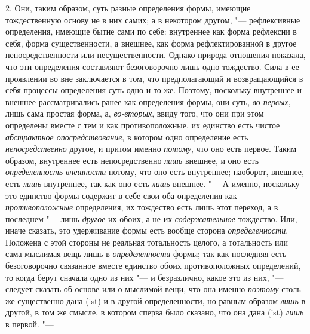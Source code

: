 2. Они, таким образом, суть разные определения формы, имеющие тождественную
основу не в них самих; а в некотором другом, "--- рефлексивные определения,
имеющие бытие сами по себе: внутреннее как форма рефлексии в себя, форма
существенности, а внешнее, как форма рефлектированной в другое
непосредственности или несущественности. Однако природа отношения показала,
что эти определения составляют безоговорочно лишь одно тождество. Сила в ее
проявлении во вне заключается в том, что предполагающий и возвращающийся в
себя процессы определения суть одно и то же. Поэтому, поскольку внутреннее
и внешнее рассматривались ранее как определения формы, они суть,
{\em во-первых}, лишь сама простая форма, а,
{\em во-вторых}, ввиду того, что они при этом
определены вместе с тем и как противоположные, их единство есть чистое
{\em абстрактное опосредствование}, в котором одно
определение есть {\em непосредственно} другое, и притом
именно {\em потому}, что оно есть первое. Таким
образом, внутреннее есть непосредственно {\em лишь}
внешнее, и оно есть {\em определенность внешности}
потому, что оно есть внутреннее; наоборот, внешнее, есть
{\em лишь} внутреннее, так как оно есть
{\em лишь} внешнее. "--- А именно, поскольку это единство
формы содержит в себе свои оба определения как
{\em противоположные} определения, их тождество есть
лишь этот переход, а в последнем "--- лишь {\em другое} их
обоих, а не их {\em содержательное} тождество. Или,
иначе сказать, это удерживание формы есть вообще сторона
{\em определенности}. Положена с этой стороны не
реальная тотальность целого, а тотальность или сама мыслимая вещь лишь в
{\em определенности} формы; так как последняя есть
безоговорочно связанное вместе единство обоих противоположных определений,
то когда берут сначала одно из них "--- и безразлично, какое это из них, "---
следует сказать об основе или о мыслимой вещи, что она именно
{\em поэтому} столь же существенно дана (ist) и в
другой определенности, но равным образом {\em лишь} в
другой, в том же смысле, в котором сперва было сказано, что она дана (ist)
{\em лишь} в первой. "---

